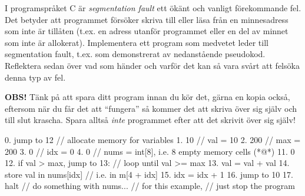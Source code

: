 \begin{Extrauppgifter}
    \item {}
    I programspråket C är \emph{segmentation fault} ett ökänt och vanligt förekommande fel. Det betyder att programmet försöker skriva till eller läsa från en minnesadress som inte är tillåten (t.ex. en adress utanför programmet eller en del av minnet som inte är allokerat).    
    Implementera ett program som medvetet leder till segmentation fault, t.ex. som demonstrerat av nedanstående pseudokod. Reflektera sedan över vad som händer och varför det kan så vara svårt att felsöka denna typ av fel.

    \halfblankline
    \textbf{OBS!} Tänk på att spara ditt program innan du kör det, gärna en kopia också, eftersom när du får det att ``fungera'' så kommer det att skriva över sig själv och till slut krascha. Spara alltså \emph{inte} programmet efter att det skrivit över sig själv!



 
    \begin{Code}
        0. jump to 12  // allocate memory for variables
        1. 10          // val = 10
        2. 200         // max = 200
        3. 0           // idx = 0
        4. 0           // nums = int[8], i.e. 8 empty memory cells
        (*@\dots@*)
       11. 0
       12. if val > max, jump to 13:   // loop until val >= max
       13.     val = val + val
       14.     store val in nums[idx]  // i.e. in m[4 + idx]
       15.     idx = idx + 1
       16.     jump to 10
       17. halt                        // do something with nums...
                                       // for this example,
                                       // just stop the program
    \end{Code}

\end{Extrauppgifter}
